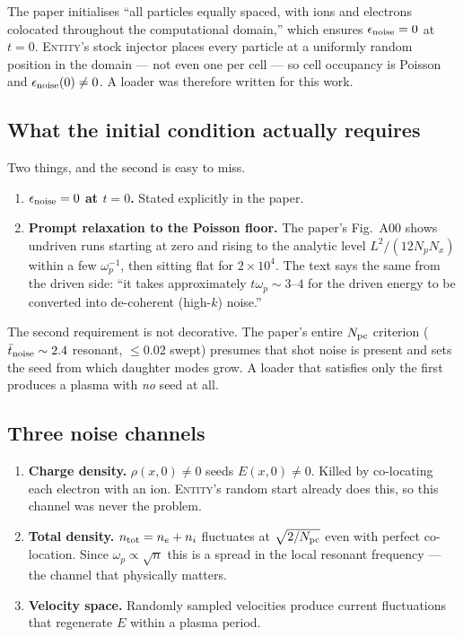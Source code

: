 \documentclass[11pt,a4paper]{article}
\newcommand{\Npc}{N_{\rm pc}}
\begin{document}
The paper initialises ``all particles equally spaced, with ions and electrons
colocated throughout the computational domain,'' which ensures
$\epsilon_{\rm noise}=0$ at $t=0$. \textsc{Entity}'s stock injector places every
particle at a uniformly random position in the domain --- not even one per cell ---
so cell occupancy is Poisson and $\epsilon_{\rm noise}(0)\neq 0$. A loader was
therefore written for this work.

\subsection{What the initial condition actually requires}
\label{sec:quietreq}

Two things, and the second is easy to miss.

\begin{enumerate}[nosep]
  \item \textbf{$\epsilon_{\rm noise}=0$ at $t=0$.} Stated explicitly in the paper.
  \item \textbf{Prompt relaxation to the Poisson floor.} The paper's Fig.~A00 shows
        undriven runs starting at zero and rising to the analytic level
        $L^2/(12N_pN_x)$ within a few $\omega_p^{-1}$, then sitting flat for
        $2\times10^4$. The text says the same from the driven side: ``it takes
        approximately $t\omega_p \sim 3$--$4$ for the driven energy to be converted
        into de-coherent (high-$k$) noise.''
\end{enumerate}

The second requirement is not decorative. The paper's entire $\Npc$ criterion
($\bar t_{\rm noise}\sim 2.4$ resonant, $\le 0.02$ swept) presumes that shot noise
is present and sets the seed from which daughter modes grow. A loader that
satisfies only the first produces a plasma with \emph{no} seed at all.

\subsection{Three noise channels}

\begin{enumerate}[nosep]
  \item \textbf{Charge density.} $\rho(x,0)\neq 0$ seeds $E(x,0)\neq0$. Killed by
        co-locating each electron with an ion. \textsc{Entity}'s random start
        already does this, so this channel was never the problem.
  \item \textbf{Total density.} $n_{\rm tot}=n_e+n_i$ fluctuates at
        $\sqrt{2/\Npc}$ even with perfect co-location. Since
        $\omega_p\propto\sqrt{n}$ this is a spread in the local resonant frequency
        --- the channel that physically matters.
  \item \textbf{Velocity space.} Randomly sampled velocities produce current
        fluctuations that regenerate $E$ within a plasma period.
\end{enumerate}
\end{document}
